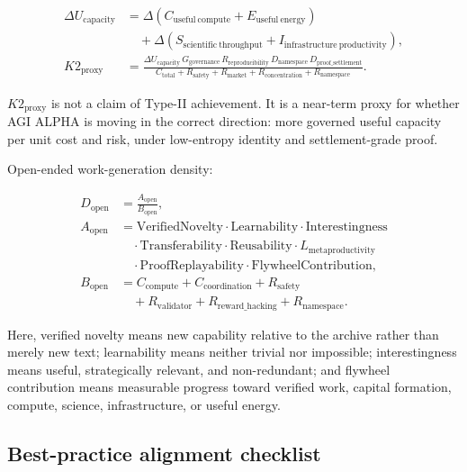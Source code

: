 \documentclass[
  11pt,
]{article}
\begin{document}
\[
\begin{aligned}
\Delta U_{\mathrm{capacity}}
&=\Delta\!\left(C_{\mathrm{useful\ compute}}+E_{\mathrm{useful\ energy}}\right)\\
&\quad+\Delta\!\left(S_{\mathrm{scientific\ throughput}}
+I_{\mathrm{infrastructure\ productivity}}\right),\\[0.2em]
K2_{\mathrm{proxy}}
&=\frac{
\Delta U_{\mathrm{capacity}}\,
G_{\mathrm{governance}}\,
R_{\mathrm{reproducibility}}\,
D_{\mathrm{namespace}}\,
D_{\mathrm{proof\_settlement}}
}{
C_{\mathrm{total}}+R_{\mathrm{safety}}+R_{\mathrm{market}}
+R_{\mathrm{concentration}}+R_{\mathrm{namespace}}
}.
\end{aligned}
\]

\(K2_{\mathrm{proxy}}\) is not a claim of Type-II achievement. It is a
near-term proxy for whether AGI ALPHA is moving in the correct
direction: more governed useful capacity per unit cost and risk, under
low-entropy identity and settlement-grade proof.

Open-ended work-generation density:

\[
\begin{aligned}
D_{\mathrm{open}}&=\frac{A_{\mathrm{open}}}{B_{\mathrm{open}}},\\
A_{\mathrm{open}}&=\mathrm{VerifiedNovelty}\cdot\mathrm{Learnability}\cdot\mathrm{Interestingness}\\
&\quad\cdot\mathrm{Transferability}\cdot\mathrm{Reusability}\cdot L_{\mathrm{metaproductivity}}\\
&\quad\cdot\mathrm{ProofReplayability}\cdot\mathrm{FlywheelContribution},\\
B_{\mathrm{open}}&=C_{\mathrm{compute}}+C_{\mathrm{coordination}}+R_{\mathrm{safety}}\\
&\quad+R_{\mathrm{validator}}+R_{\mathrm{reward\_hacking}}+R_{\mathrm{namespace}}.
\end{aligned}
\]

Here, verified novelty means new capability relative to the archive
rather than merely new text; learnability means neither trivial nor
impossible; interestingness means useful, strategically relevant, and
non-redundant; and flywheel contribution means measurable progress
toward verified work, capital formation, compute, science,
infrastructure, or useful energy.

\subsection{Best-practice alignment
checklist}\label{best-practice-alignment-checklist}
\end{document}
